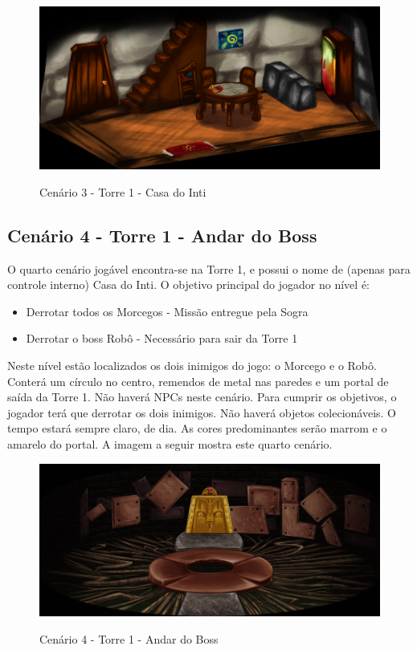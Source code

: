 \documentclass[12pt]{article}
\begin{document}
\begin{figure}[!htb]
	\centering
    \includegraphics[scale=0.35]{cenario_03.png}
    \label{fig:cenario_03}
    \caption{Cenário 3 - Torre 1 - Casa do Inti}
\end{figure}

\newpage

\subsection{Cenário 4 - Torre 1 - Andar do Boss}

O quarto cenário jogável encontra-se na Torre 1, e possui o nome de (apenas
para controle interno) Casa do Inti. O objetivo principal do jogador no
nível é:

\begin{itemize}
    \item Derrotar todos os Morcegos - Missão entregue pela Sogra
    \item Derrotar o boss Robô - Necessário para sair da Torre 1
\end{itemize}

Neste nível estão localizados os dois inimigos do jogo: o Morcego e o Robô.
Conterá um círculo no centro, remendos de metal nas paredes e um portal de saída
da Torre 1. Não haverá NPCs neste cenário. Para cumprir os objetivos, o jogador
terá que derrotar os dois inimigos. Não haverá objetos colecionáveis. O tempo
estará sempre claro, de dia. As cores predominantes serão marrom e o amarelo
do portal. A imagem a seguir mostra este quarto cenário.

\begin{figure}[!htb]
	\centering
    \includegraphics[scale=0.4]{cenario_04.png}
    \label{fig:cenario_04}
    \caption{Cenário 4 - Torre 1 - Andar do Boss}
\end{figure}
\end{document}
